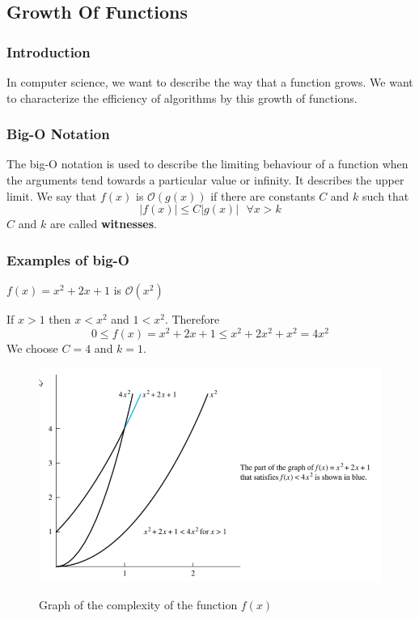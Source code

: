 \documentclass{article}
\begin{document}
\subsection{Growth Of Functions}
\subsubsection{Introduction} In computer science, we want to describe the way that a function grows. We want to characterize the efficiency of algorithms by this growth of functions.

\subsubsection{Big-O Notation} The big-O notation is used to describe the limiting behaviour of a function when the arguments tend towards a particular value or infinity. It describes the upper limit. We say that $ f(x) $ is $ \mathcal{O}(g(x)) $ if there are constants $ C $ and $ k $ such that
\begin{equation}
|f(x)| \leq C|g(x)| \textit{  } \forall x > k
\end{equation}
$ C $ and $ k $ are called \textbf{witnesses}.

\subsubsection{Examples of big-O} $ f(x) = x^2 + 2x + 1 $ is $ \mathcal{O}(x^2) $
\begin{tcolorbox}[width=12.1cm]
If $ x > 1 $ then $ x < x^2 $ and $ 1 < x^2 $. Therefore
\begin{equation}
0 \leq f(x) = x^2 + 2x + 1 \leq x^2 + 2x^2 + x^2 = 4x^2
\end{equation}
We choose $ C = 4 $ and $ k = 1 $.
\end{tcolorbox}

\begin{figure}[h]
  \includegraphics[width=\linewidth]{bigo.png}
  \label{fig:bigo}
	
\caption{Graph of the complexity of the function $ f(x) $} 	
\end{figure}
\end{document}
